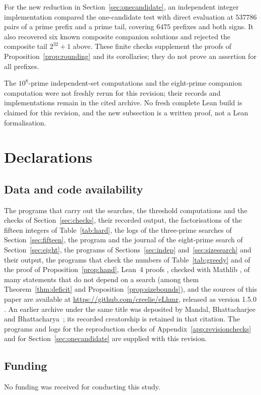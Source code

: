 \documentclass[screen,reqno]{aomart}
\numberwithin{equation}{section}
\theoremstyle{plain}
\theoremstyle{definition}
\theoremstyle{remark}
\newcommand{\releaseline}{, released as version 1.5.0 \cite{Data}}
\begin{document}
For the new reduction in Section~\ref{sec:onecandidate}, an
independent integer implementation compared the one-candidate test
with direct evaluation at $537786$ pairs of a prime prefix and a
prime tail, covering $6475$ prefixes and both signs. It also recovered
six known composite companion solutions and rejected the composite
tail $2^{32}+1$ above. These finite checks supplement the proofs of
Proposition~\ref{prop:rounding} and its corollaries; they do not prove
an assertion for all prefixes.

The $10^8$-prime independent-set computations and the eight-prime
companion computation were not freshly rerun for this revision;
their records and implementations remain in the cited archive.
No fresh complete Lean build is claimed for this revision, and the
new subsection is a written proof, not a Lean formalisation.

\section*{Declarations}

\subsection*{Data and code availability}
The programs that carry out the searches, the threshold computations
and the checks of Section~\ref{sec:checks}, their recorded output, the
factorisations of the fifteen integers of Table~\ref{tab:hard}, the
logs of the three-prime searches of Section~\ref{sec:fifteen}, the
program and the journal of the eight-prime search of
Section~\ref{sec:eight}, the programs of Sections~\ref{sec:indep}
and~\ref{sec:sizesearch} and their output, the programs that check the
numbers of Table~\ref{tab:greedy} and of the proof of
Proposition~\ref{prop:hand}, Lean~4 proofs \cite{dMU21}, checked
with Mathlib \cite{Mathlib}, of many statements that do not depend on
a search (among them Theorem~\ref{thm:deficit} and
Proposition~\ref{prop:sizebounds}), and the sources of this paper are
available at
\url{https://github.com/creelie/eLhmr}\releaseline.
An earlier archive under the same title was deposited by Mandal,
Bhattacharjee and Bhattacharya~\cite{EarlierData}; its recorded
creatorship is retained in that citation. The programs and logs for
the reproduction checks of Appendix~\ref{app:revisionchecks} and for
Section~\ref{sec:onecandidate} are supplied with this revision.

\subsection*{Funding}
No funding was received for conducting this study.
\end{document}
